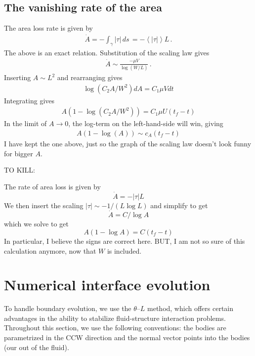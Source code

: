 \documentclass[11pt]{article}
\newcommand{\vsp}[1]{\vspace{#1 pc} \noindent}
\newcommand{\abs}[1]{\left| #1 \right|}
\newcommand{\mean}[1]{\left< #1 \right>}
\newcommand{\atau}{\abs{\tau}}
\newcommand{\thL}{$\theta$--$L$}
\begin{document}
\subsection{The vanishing rate of the area}

The area loss rate is given by
\begin{align}
\dot{A} = - \int_{\gamma} \atau \, ds \,  = - \mean{\atau} L \, .
\end{align}
The above is an exact relation. Substitution of the scaling law gives
\begin{align}
\dot{A} \sim \frac{ - \mu V}{\log(W/L)} \, .
\end{align}
Inserting $A \sim L^2$ and rearranging gives
\begin{align}
\log (C_2 A/W^2) dA = C_1 \mu V dt
\end{align}
Integrating gives
\begin{align}
A \left(1 - \log(C_2 A/W^2) \right) = C_1 \mu U (t_f - t)
\end{align}
In the limit of $A \to 0$, the log-term on the left-hand-side will win, giving
\begin{align}
A(1 - \log(A) ) \sim c_A (t_f - t)
\end{align}
I have kept the one above, just so the graph of the scaling law doesn't look funny for bigger $A$.

\vsp{5}
TO KILL:

The rate of area loss is given by
\begin{equation}
\dot{A} = - \abs{\tau} L
\end{equation}
We then insert the scaling $\abs{\tau} \sim -1/(L \log L)$ and simplify to get
\begin{equation}
\dot{A} = C/\log{A}
\end{equation}
which we solve to get
\begin{equation}
A (1 - \log A) = C (t_f - t)
\end{equation}
In particular, I believe the signs are correct here.
BUT, I am not so sure of this calculation anymore, now that $W$ is included.


\section{Numerical interface evolution}

To handle boundary evolution, we use the {\thL} method, which offers certain advantages in the ability to stabilize fluid-structure interaction problems. Throughout this section, we use the following conventions: the bodies are parametrized in the CCW direction and the normal vector points into the bodies (our out of the fluid).
\end{document}
